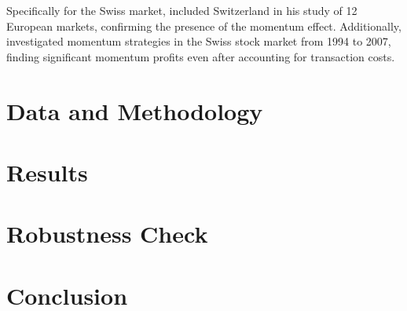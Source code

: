 \documentclass{article}
\begin{document}
Specifically for the Swiss market, \cite{rouwenhorst1998} included Switzerland in his study of 12 European markets, confirming the presence of the momentum effect. Additionally, \cite{ammann2008} investigated momentum strategies in the Swiss stock market from 1994 to 2007, finding significant momentum profits even after accounting for transaction costs.

\newpage
\section{Data and Methodology}




\newpage

\section{Results}


\newpage


\section{Robustness Check}

\newpage

\section{Conclusion}


\newpage

\printbibliography
\end{document}
